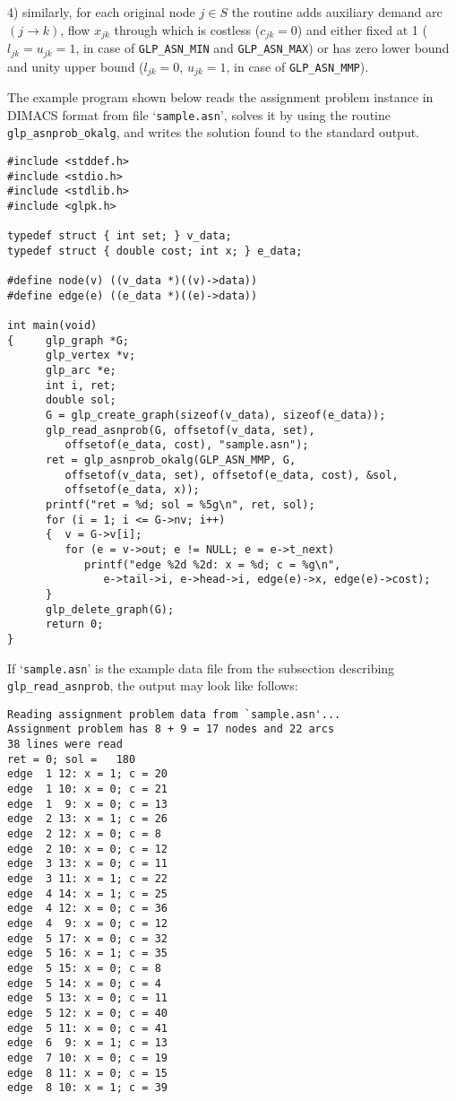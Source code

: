 \documentclass[11pt]{report}
\def\para#1{\noindent{\bf#1}}
\begin{document}
4) similarly, for each original node $j\in S$ the routine adds
auxiliary demand arc $(j\rightarrow k)$, flow $x_{jk}$ through which is
costless ($c_{jk}=0$) and either fixed at 1 ($l_{jk}=u_{jk}=1$, in case
of \verb|GLP_ASN_MIN| and \verb|GLP_ASN_MAX|) or has zero lower bound
and unity upper bound ($l_{jk}=0$, $u_{jk}=1$, in case of
\verb|GLP_ASN_MMP|).

\para{Example}

The example program shown below reads the assignment problem instance
in DIMACS format from file `\verb|sample.asn|', solves it by using the
routine \verb|glp_asnprob_okalg|, and writes the solution found to the
standard output.

\begin{footnotesize}
\begin{verbatim}
#include <stddef.h>
#include <stdio.h>
#include <stdlib.h>
#include <glpk.h>

typedef struct { int set; } v_data;
typedef struct { double cost; int x; } e_data;

#define node(v) ((v_data *)((v)->data))
#define edge(e) ((e_data *)((e)->data))

int main(void)
{     glp_graph *G;
      glp_vertex *v;
      glp_arc *e;
      int i, ret;
      double sol;
      G = glp_create_graph(sizeof(v_data), sizeof(e_data));
      glp_read_asnprob(G, offsetof(v_data, set),
         offsetof(e_data, cost), "sample.asn");
      ret = glp_asnprob_okalg(GLP_ASN_MMP, G,
         offsetof(v_data, set), offsetof(e_data, cost), &sol,
         offsetof(e_data, x));
      printf("ret = %d; sol = %5g\n", ret, sol);
      for (i = 1; i <= G->nv; i++)
      {  v = G->v[i];
         for (e = v->out; e != NULL; e = e->t_next)
            printf("edge %2d %2d: x = %d; c = %g\n",
               e->tail->i, e->head->i, edge(e)->x, edge(e)->cost);
      }
      glp_delete_graph(G);
      return 0;
}
\end{verbatim}
\end{footnotesize}

If `\verb|sample.asn|' is the example data file from the subsection
describing \verb|glp_read_asnprob|, the output may look like follows:

\begin{footnotesize}
\begin{verbatim}
Reading assignment problem data from `sample.asn'...
Assignment problem has 8 + 9 = 17 nodes and 22 arcs
38 lines were read
ret = 0; sol =   180
edge  1 12: x = 1; c = 20
edge  1 10: x = 0; c = 21
edge  1  9: x = 0; c = 13
edge  2 13: x = 1; c = 26
edge  2 12: x = 0; c = 8
edge  2 10: x = 0; c = 12
edge  3 13: x = 0; c = 11
edge  3 11: x = 1; c = 22
edge  4 14: x = 1; c = 25
edge  4 12: x = 0; c = 36
edge  4  9: x = 0; c = 12
edge  5 17: x = 0; c = 32
edge  5 16: x = 1; c = 35
edge  5 15: x = 0; c = 8
edge  5 14: x = 0; c = 4
edge  5 13: x = 0; c = 11
edge  5 12: x = 0; c = 40
edge  5 11: x = 0; c = 41
edge  6  9: x = 1; c = 13
edge  7 10: x = 0; c = 19
edge  8 11: x = 0; c = 15
edge  8 10: x = 1; c = 39
\end{verbatim}
\end{footnotesize}
\end{document}
